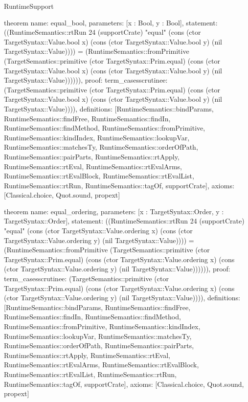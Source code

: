 \begin{lexlean}{RuntimeSupport}
\begin{semanticmodule}
theorem{
  name: equal_bool,
  parameters: [x : Bool, y : Bool],
  statement: ((RuntimeSemantics::rtRun 24 (supportCrate) "equal" (cons (ctor TargetSyntax::Value.bool x) (cons (ctor TargetSyntax::Value.bool y) (nil TargetSyntax::Value)))) = (RuntimeSemantics::fromPrimitive (TargetSemantics::primitive (ctor TargetSyntax::Prim.equal) (cons (ctor TargetSyntax::Value.bool x) (cons (ctor TargetSyntax::Value.bool y) (nil TargetSyntax::Value)))))),
  proof: term_cases{scrutinee: (TargetSemantics::primitive (ctor TargetSyntax::Prim.equal) (cons (ctor TargetSyntax::Value.bool x) (cons (ctor TargetSyntax::Value.bool y) (nil TargetSyntax::Value)))), definitions: [RuntimeSemantics::bindParams, RuntimeSemantics::findFree, RuntimeSemantics::findIn, RuntimeSemantics::findMethod, RuntimeSemantics::fromPrimitive, RuntimeSemantics::kindIndex, RuntimeSemantics::lookupVar, RuntimeSemantics::matchesTy, RuntimeSemantics::orderOfPath, RuntimeSemantics::pairParts, RuntimeSemantics::rtApply, RuntimeSemantics::rtEval, RuntimeSemantics::rtEvalArms, RuntimeSemantics::rtEvalBlock, RuntimeSemantics::rtEvalList, RuntimeSemantics::rtRun, RuntimeSemantics::tagOf, supportCrate]},
  axioms: [Classical.choice, Quot.sound, propext]
}

theorem{
  name: equal_ordering,
  parameters: [x : TargetSyntax::Order, y : TargetSyntax::Order],
  statement: ((RuntimeSemantics::rtRun 24 (supportCrate) "equal" (cons (ctor TargetSyntax::Value.ordering x) (cons (ctor TargetSyntax::Value.ordering y) (nil TargetSyntax::Value)))) = (RuntimeSemantics::fromPrimitive (TargetSemantics::primitive (ctor TargetSyntax::Prim.equal) (cons (ctor TargetSyntax::Value.ordering x) (cons (ctor TargetSyntax::Value.ordering y) (nil TargetSyntax::Value)))))),
  proof: term_cases{scrutinee: (TargetSemantics::primitive (ctor TargetSyntax::Prim.equal) (cons (ctor TargetSyntax::Value.ordering x) (cons (ctor TargetSyntax::Value.ordering y) (nil TargetSyntax::Value)))), definitions: [RuntimeSemantics::bindParams, RuntimeSemantics::findFree, RuntimeSemantics::findIn, RuntimeSemantics::findMethod, RuntimeSemantics::fromPrimitive, RuntimeSemantics::kindIndex, RuntimeSemantics::lookupVar, RuntimeSemantics::matchesTy, RuntimeSemantics::orderOfPath, RuntimeSemantics::pairParts, RuntimeSemantics::rtApply, RuntimeSemantics::rtEval, RuntimeSemantics::rtEvalArms, RuntimeSemantics::rtEvalBlock, RuntimeSemantics::rtEvalList, RuntimeSemantics::rtRun, RuntimeSemantics::tagOf, supportCrate]},
  axioms: [Classical.choice, Quot.sound, propext]
}


\end{semanticmodule}
\end{lexlean}
